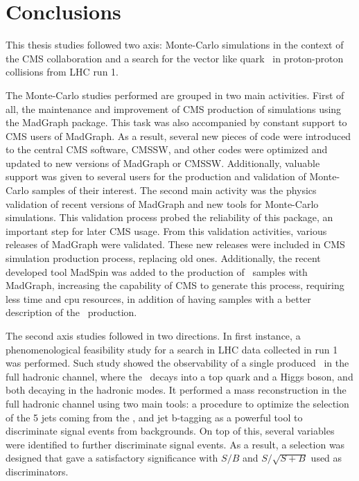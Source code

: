 \chapter*{Conclusions}

This thesis studies followed two axis: Monte-Carlo simulations in the context of the CMS collaboration and a search for the vector like quark \Tp~in proton-proton collisions from LHC run 1.

The Monte-Carlo studies performed are grouped in two main activities. First of all, the maintenance and improvement of CMS production of simulations using the MadGraph package. This task was also accompanied by constant support to CMS users of MadGraph. As a result, several new pieces of code were introduced to the central CMS software, CMSSW, and other codes were optimized and updated to new versions of MadGraph or CMSSW. Additionally, valuable support was given to several users for the production and validation of Monte-Carlo samples of their interest. The second main activity was the physics validation of recent versions of MadGraph and new tools for Monte-Carlo simulations. This validation process probed the reliability of this package, an important step for later CMS usage. From this validation activities, various releases of MadGraph were validated. These new releases were included in CMS simulation production process, replacing old ones. Additionally, the recent developed tool MadSpin was added to the production of \ttbar~samples with MadGraph, increasing the capability of CMS to generate this process, requiring less time and cpu resources, in addition of having samples with a better description of the \ttbar~production.

The second axis studies followed in two directions. In first instance, a phenomenological feasibility study for a search in LHC data collected in run 1 was performed. Such study showed the observability of a single produced \Tp~in the full hadronic channel, where the \Tp~decays into a top quark and a Higgs boson, and both decaying in the hadronic modes. It performed a mass reconstruction in the full hadronic channel using two main tools: a procedure to optimize the selection of the 5 jets coming from the \Tp, and jet b-tagging as a powerful tool to discriminate signal events from backgrounds. On top of this, several variables were identified to further discriminate signal events. As a result, a selection was designed that gave a satisfactory significance with $S/B$ and $S/\sqrt{S+B}$ used as discriminators.

